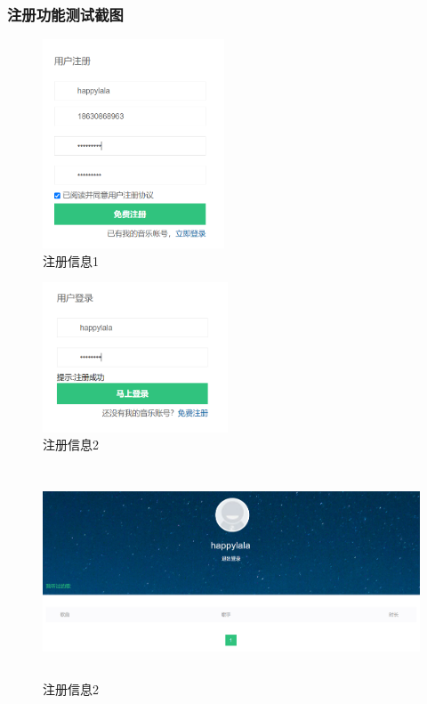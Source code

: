 \documentclass[UTF8,14pt]{article}
\numberwithin{figure}{subsubsection}
\numberwithin{table}{subsubsection}
\begin{document}
\subsubsection{注册功能测试截图}
\begin{minipage}[t]{0.5\linewidth}
	\begin{figure}[H]
		\includegraphics[width=5.39cm,height=6.21cm]{figures/register1.png}
		\caption{注册信息1}
	\end{figure}
\end{minipage}
\hfill
\begin{minipage}[t]{0.5\linewidth}
	\begin{figure}[H]
		\centering
		\includegraphics[width=5.51cm,height=4.46cm]{figures/register2.png}
		\caption{注册信息2}
	\end{figure}
\end{minipage}
\begin{figure}[H]
	\centering
	\includegraphics[width=14.664cm,height=6.256cm]{figures/register3.png}
	\caption{注册信息2}
\end{figure}
\end{document}
